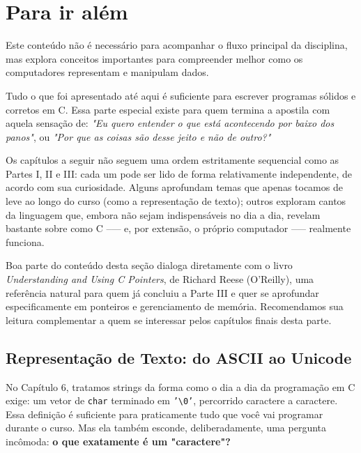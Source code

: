 \documentclass[12pt,a4paper,oneside]{extreport}
\begin{document}


\part{Para ir além}

\begin{tcolorbox}[title={Para ir além}]
Este conteúdo não é necessário para acompanhar o fluxo principal
da disciplina, mas explora conceitos importantes para compreender
melhor como os computadores representam e manipulam dados.
\end{tcolorbox}

Tudo o que foi apresentado até aqui é suficiente para escrever programas sólidos e corretos em C. Essa parte especial existe para quem termina a apostila com aquela sensação de: \textit{"Eu quero entender o que está acontecendo por baixo dos panos"}, ou \textit{"Por que as coisas são desse jeito e não de outro?"}

Os capítulos a seguir não seguem uma ordem estritamente sequencial como as Partes I, II e III: cada um pode ser lido de forma relativamente independente, de acordo com sua curiosidade. Alguns aprofundam temas que apenas tocamos de leve ao longo do curso (como a representação de texto); outros exploram cantos da linguagem que, embora não sejam indispensáveis no dia a dia, revelam bastante sobre como C --— e, por extensão, o próprio computador —-- realmente funciona.

Boa parte do conteúdo desta seção dialoga diretamente com o livro \textit{Understanding and Using C Pointers}, de Richard Reese (O'Reilly), uma referência natural para quem já concluiu a Parte III e quer se aprofundar especificamente em ponteiros e gerenciamento de memória. Recomendamos sua leitura complementar a quem se interessar pelos capítulos finais desta parte.

\chapter*{Representação de Texto: do ASCII ao Unicode}

No Capítulo 6, tratamos strings da forma como o dia a dia da programação em C exige: um vetor de \texttt{char} terminado em \texttt{'\textbackslash 0'}, percorrido caractere a caractere. Essa definição é suficiente para praticamente tudo que você vai programar durante o curso. Mas ela também esconde, deliberadamente, uma pergunta incômoda: \textbf{o que exatamente é um "caractere"?}
\end{document}

